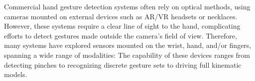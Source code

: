 \documentclass [11pt, proquest] {uwthesis}[2020/02/24]
\begin{document}
Commercial hand gesture detection systems \cite{microsoft, MetaStore, TrackingUltraleap} often rely on optical methods, using cameras mounted on external devices such as AR/VR headsets or necklaces. However, these systems require a clear line of sight to the hand, complicating efforts to  detect gestures made outside the camera's field of view.
Therefore, many systems have explored sensors mounted on the wrist, hand, and/or fingers, spanning a wide range of modalities: 
The capability of these devices ranges from detecting pinches to recognizing discrete gesture sets to driving full kinematic models.
\end{document}
